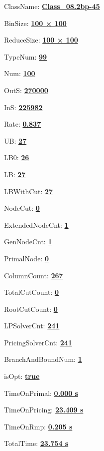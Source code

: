 \documentclass[11pt]{article}
\begin{document}
\pagestyle{empty}


ClassName: \underline{\textbf{Class_08.2bp-45}}
\par
BinSize: \underline{\textbf{100 × 100}}
\par
ReduceSize: \underline{\textbf{100 × 100}}
\par
TypeNum: \underline{\textbf{99}}
\par
Num: \underline{\textbf{100}}
\par
OutS: \underline{\textbf{270000}}
\par
InS: \underline{\textbf{225982}}
\par
Rate: \underline{\textbf{0.837}}
\par
UB: \underline{\textbf{27}}
\par
LB0: \underline{\textbf{26}}
\par
LB: \underline{\textbf{27}}
\par
LBWithCut: \underline{\textbf{27}}
\par
NodeCut: \underline{\textbf{0}}
\par
ExtendedNodeCnt: \underline{\textbf{1}}
\par
GenNodeCnt: \underline{\textbf{1}}
\par
PrimalNode: \underline{\textbf{0}}
\par
ColumnCount: \underline{\textbf{267}}
\par
TotalCutCount: \underline{\textbf{0}}
\par
RootCutCount: \underline{\textbf{0}}
\par
LPSolverCnt: \underline{\textbf{241}}
\par
PricingSolverCnt: \underline{\textbf{241}}
\par
BranchAndBoundNum: \underline{\textbf{1}}
\par
isOpt: \underline{\textbf{true}}
\par
TimeOnPrimal: \underline{\textbf{0.000 s}}
\par
TimeOnPricing: \underline{\textbf{23.409 s}}
\par
TimeOnRmp: \underline{\textbf{0.205 s}}
\par
TotalTime: \underline{\textbf{23.754 s}}
\par
\newpage


\end{document}
